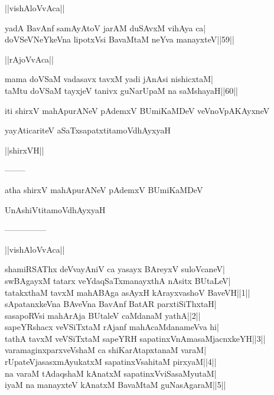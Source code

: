 \documentclass{article}
\begin{document}
\begin{center}
||vishAloVvAca||
\end{center}

yadA BavAnf samAyAtoV jarAM duSAvxM vihAya ca|\\
doVSeVNeYkeVna lipotxVsi BavaMtaM neYva manayxteV||59||\\

\begin{center}
||rAjoVvAca||
\end{center}

mama doVSaM vadasavx tavxM yadi jAnAsi nishicxtaM|\\
taMtu doVSaM tayxjeV tanivx guNarUpaM na saMshayaH||60||

\begin{center}
iti shirxV mahApurANeV pAdemxV BUmiKaMDeV veVnoVpAKAyxneV
\end{center}

\begin{center}
yayAticariteV aSaTxsapatxtitamoVdhAyxyaH
\end{center}

\begin{center}
||shirxVH||
\end{center}

\begin{center}
--------
\end{center}

\begin{center}
atha shirxV mahApurANeV pAdemxV BUmiKaMDeV
\end{center}

\begin{center}
UnAshiVtitamoVdhAyxyaH
\end{center}

\begin{center}

---------------
\end{center}

\begin{center}
||vishAloVvAca||
\end{center}

shamiRSAThx deVvayAniV ca yasayx BAreyxV suloVcaneV|\\
swBAgayxM tatarx veYdaqSaTxmanayxthA nAsitx BUtaLeV|\\
tatakxthaM tavxM mahABAga asAyxH kArayxvashoV BaveVH||1||\\
sApatanxkeVna BAveVna BavAnf BatAR parxtiSiThxtaH|\\
sasapoRVsi mahArAja BUtaleV caMdanaM yathA||2||\\
sapeYRshacx veVSiTxtaM rAjanf mahAcaMdanameVva hi|\\
tathA tavxM veVSiTxtaM sapeYRH sapatinxVnAmasaMjacnxkeYH||3||\\
varamaginxparxveVshaM ca shiKarAtapxtanaM varaM|\\
rUpateVjasasxmAyukatxM sapatinxVsahitaM pirxyaM||4||\\
na varaM tAdaqshaM kAnatxM sapatinxVviSasaMyutaM|\\
iyaM na manayxteV kAnatxM BavaMtaM guNasAgaraM||5||\\
\end{document}

